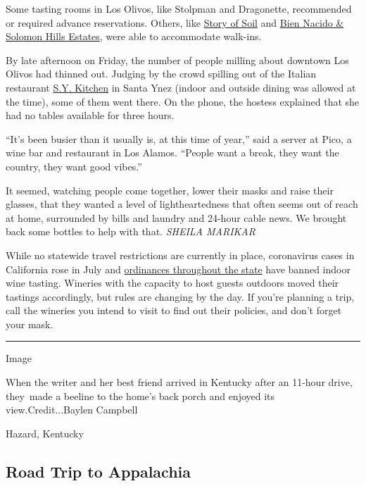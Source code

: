 Some tasting rooms in Los Olivos, like Stolpman and Dragonette,
recommended or required advance reservations. Others, like
\href{http://storyofsoilwine.com/}{Story of Soil} and
\href{https://biennacidoestate.com/}{Bien Nacido \& Solomon Hills
Estates}, were able to accommodate walk-ins.

By late afternoon on Friday, the number of people milling about downtown
Los Olivos had thinned out. Judging by the crowd spilling out of the
Italian restaurant \href{https://www.sykitchen.com/}{S.Y. Kitchen} in
Santa Ynez (indoor and outside dining was allowed at the time), some of
them went there. On the phone, the hostess explained that she had no
tables available for three hours.

``It's been busier than it usually is, at this time of year,'' said a
server at Pico, a wine bar and restaurant in Los Alamos. ``People want a
break, they want the country, they want good vibes.''

It seemed, watching people come together, lower their masks and raise
their glasses, that they wanted a level of lightheartedness that often
seems out of reach at home, surrounded by bills and laundry and 24-hour
cable news. We brought back some bottles to help with that. \emph{SHEILA
MARIKAR}

While no statewide travel restrictions are currently in place,
coronavirus cases in California rose in July and
\href{https://www.nytimes.com/interactive/2020/us/california-coronavirus-cases.html}{ordinances
throughout the state} have banned indoor wine tasting. Wineries with the
capacity to host guests outdoors moved their tastings accordingly, but
rules are changing by the day. If you're planning a trip, call the
wineries you intend to visit to find out their policies, and don't
forget your mask.

\begin{center}\rule{0.5\linewidth}{\linethickness}\end{center}

Image

When the writer and her best friend arrived in Kentucky after an 11-hour
drive, they~made a beeline to the home's back porch and enjoyed its
view.Credit...Baylen Campbell

Hazard, Kentucky

\hypertarget{road-trip-to-appalachia}{%
\subsection{Road Trip to Appalachia}\label{road-trip-to-appalachia}}

